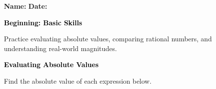 \documentclass[12pt, letterpaper, fleqn]{article}
\begin{document}
\textbf{Name:} \underline{\hspace{5cm}}
\hfill
\textbf{Date:} \underline{\hspace{3cm}}\\

\begin{tcolorbox}[colback=black!10]
    \large\textcolor{black}{\textbf{Beginning: Basic Skills}}
\end{tcolorbox}

\vspace{3mm}

\noindent
Practice evaluating absolute values, comparing rational numbers, and understanding real-world magnitudes.

\vspace{4mm}

\begin{tcolorbox}[colback=black!10]
\large\textcolor{black}{\textbf{Evaluating Absolute Values}}
\end{tcolorbox}
\noindent
Find the absolute value of each expression below.
\vspace{2mm}
\end{document}

